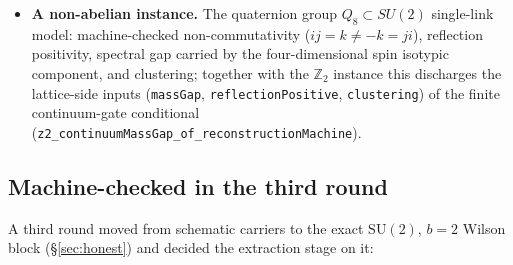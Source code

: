 \documentclass[11pt]{article}
\theoremstyle{definition}
\begin{document}
\begin{itemize}
    complement give exponential decay of truncated two-point functions at rate
    $-\log q$ (\texttt{abs\_truncatedTwoPoint\_le\_exp}); conversely, RP plus
    per-vector moment decay $\langle v, T^{n}v\rangle \leq C_v q^{n}$ on a
    dense subset gives the gap
    (\texttt{eigenvalue\_abs\_le\_of\_moment\_decay}) --- note the
    \emph{per-vector} constants: only the rate must be uniform, which weakens
    what the manuscript's Assumptions K.7/M.5 need to supply. A regression
    records that an additive $t$-independent tail defeats the conclusion
    (\texttt{moment\_decay\_additive\_defeat}), so large-field remainders must
    decay, not merely be small.
  \item \textbf{A non-abelian instance.} The quaternion group
    $Q_8\subset SU(2)$ single-link model: machine-checked non-commutativity
    ($ij=k\neq -k=ji$), reflection positivity, spectral gap carried by the
    four-dimensional spin isotypic component, and clustering; together with the
    $\mathbb{Z}_2$ instance this discharges the lattice-side inputs
    (\texttt{massGap}, \texttt{reflectionPositive}, \texttt{clustering}) of the
    finite continuum-gate conditional
    (\texttt{z2\_continuumMassGap\_of\_reconstructionMachine}).
\end{itemize}

\subsection*{Machine-checked in the third round}

A third round moved from schematic carriers to the exact $\mathrm{SU}(2)$,
$b=2$ Wilson block (\S\ref{sec:honest}) and decided the extraction stage on
it:
\end{document}
